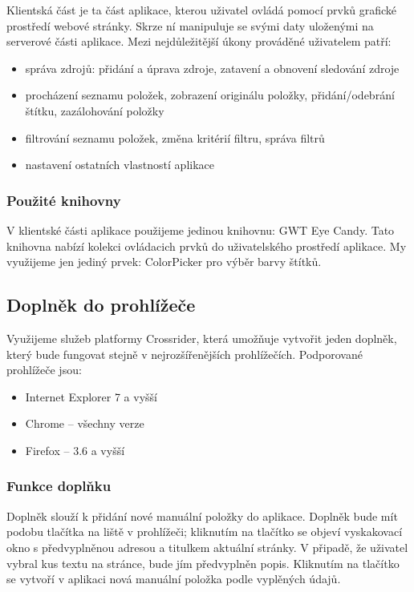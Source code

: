 Klientská část je ta část aplikace, kterou uživatel ovládá pomocí prvků grafické prostředí webové stránky.
Skrze ní manipuluje se svými daty uloženými na serverové části aplikace.
Mezi nejdůležitější úkony prováděné uživatelem patří:
\begin{itemize}
	\item správa zdrojů: přidání a úprava zdroje, zatavení a obnovení sledování zdroje
	\item procházení seznamu položek, zobrazení originálu položky, přidání/odebrání štítku, zazálohování položky
	\item filtrování seznamu položek, změna kritérií filtru, správa filtrů
	\item nastavení ostatních vlastností aplikace
\end{itemize}

\subsubsection{Použité knihovny}

V klientské části aplikace použijeme jedinou knihovnu: GWT Eye Candy.
Tato knihovna nabízí kolekci ovládacich prvků do uživatelského prostředí aplikace.
My využijeme jen jediný prvek: ColorPicker pro výběr barvy štítků.

\subsection{Doplněk do prohlížeče}

Využijeme služeb platformy Crossrider, která umožňuje vytvořit jeden doplněk, který bude fungovat stejně v nejrozšířenějších prohlížečích.
Podporované prohlížeče jsou:
\begin{itemize}
	\item Internet Explorer 7 a vyšší
	\item Chrome -- všechny verze
	\item Firefox -- 3.6 a vyšší
\end{itemize}

\subsubsection{Funkce doplňku}

Doplněk slouží k přidání nové manuální položky do aplikace.
Doplněk bude mít podobu tlačítka na liště v prohlížeči; kliknutím na tlačítko se objeví vyskakovací okno s předvyplněnou adresou a titulkem aktuální stránky.
V připadě, že uživatel vybral kus textu na stránce, bude jím předvyplněn popis.
Kliknutím na tlačítko  se vytvoří v aplikaci nová manuální položka podle vyplěných údajů.

